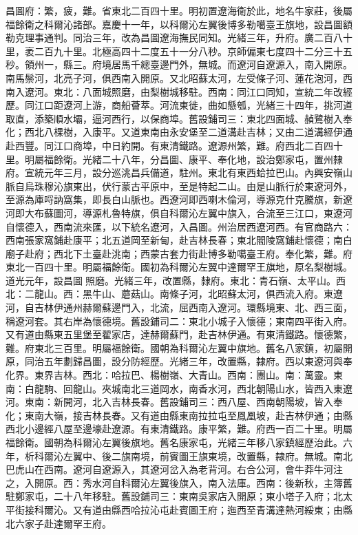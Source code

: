 \begin{pinyinscope}
昌圖府：繁，疲，難。省東北二百四十里。明初置遼海衛於此，地名牛家莊，後屬福餘衛之科爾沁諸部。嘉慶十一年，以科爾沁左翼後博多勒噶臺王旗地，設昌圖額勒克理事通判。同治三年，改為昌圖遼海撫民同知。光緒三年，升府。廣二百八十里，袤二百九十里。北極高四十二度五十一分八秒。京師偏東七度四十二分三十五秒。領州一，縣三。府境居馬千總臺邊門外，無城。而遼河自遼源入，南入開原。南馬鬃河，北亮子河，俱西南入開原。又北昭蘇太河，左受條子河、蓮花泡河，西南入遼河。東北：八面城照磨，由梨樹城移駐。西南：同江口同知，宣統二年改經歷。同江口距遼河上游，商船薈萃。河流東徙，曲如懸瓠，光緒三十四年，挑河道取直，添築順水壩，逼河西行，以保商埠。舊設鋪司三：東北四面城、赬鷺樹入奉化；西北八棵樹，入康平。又道東南由永安堡至二道溝赴吉林；又由二道溝經伊通赴西豐。同江口商埠，中日約開。有東清鐵路。遼源州繁，難。府西北二百四十里。明屬福餘衛。光緒二十八年，分昌圖、康平、奉化地，設治鄭家屯，置州隸府。宣統元年三月，設分巡洮昌兵備道，駐州。東北有東西蛤拉巴山。內興安嶺山脈自烏珠穆沁旗東出，伏行蒙古平原中，至是特起二山。由是山脈行於東遼河外，至源為庫哷訥窩集，即長白山脈也。西遼河即西喇木倫河，導源克什克騰旗，新遼河即大布蘇圖河，導源札魯特旗，俱自科爾沁左翼中旗入，合流至三江口，東遼河自懷德入，西南流來匯，以下統名遼河，入昌圖。州治居西遼河西。有官商路六：西南張家窩鋪赴康平；北五道岡至新甸，赴吉林長春；東北閻陵窩鋪赴懷德；南白廟子赴府；西北下土臺赴洮南；西蒙古套力街赴博多勒噶臺王府。奉化繁，難。府東北一百四十里。明屬福餘衛。國初為科爾沁左翼中達爾罕王旗地，原名梨樹城。道光元年，設昌圖照磨。光緒三年，改置縣，隸府。東北：青石嶺、太平山。西北：二龍山。西：黑牛山、蘑菇山。南條子河，北昭蘇太河，俱西流入府。東遼河，自吉林伊通州赫爾蘇邊門入，北流，屈西南入遼河。環縣境東、北、西三面，稱遼河套。其右岸為懷德境。舊設鋪司二：東北小城子入懷德；東南四平街入府。又有道由縣東五里堡至翟家店，達赫爾蘇門，赴吉林伊通。有東清鐵路。懷德繁，難。府東北三百里。明屬福餘衛。國朝為科爾沁左翼中旗地。舊名八家鎮，初屬開原，同治五年劃歸昌圖，設分防經歷。光緒三年，改置縣，隸府。西以東遼河與奉化界。東界吉林。西北：哈拉巴、楊樹嶺、大青山。西南：團山。南：萬靈。東南：白龍駒、回龍山。夾城南北三道岡水，南香水河，西北朝陽山水，皆西入東遼河。東南：新開河，北入吉林長春。舊設鋪司三：西八屋、西南朝陽坡，皆入奉化；東南大嶺，接吉林長春。又有道由縣東南拉拉屯至鳳凰坡，赴吉林伊通；由縣西北小邊經八屋至邊壕赴遼源。有東清鐵路。康平繁，難。府西一百二十里。明屬福餘衛。國朝為科爾沁左翼後旗地。舊名康家屯，光緒三年移八家鎮經歷治此。六年，析科爾沁左翼中、後二旗南境，前賓圖王旗東境，改置縣，隸府。無城。南北巴虎山在西南。遼河自遼源入，其遼河岔入為老背河。右合公河，會牛莽牛河注之，入開原。西：秀水河自科爾沁左翼後旗入，南入法庫。西南：後新秋，主簿舊駐鄭家屯，二十八年移駐。舊設鋪司三：東南吳家店入開原；東小塔子入府；北太平街接科爾沁。又有道由縣西哈拉沁屯赴賓圖王府；迤西至青溝達熱河綏東；由縣北六家子赴達爾罕王府。


\end{pinyinscope}
